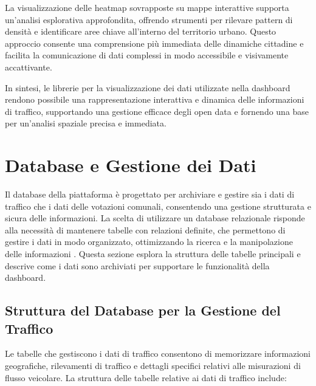 La visualizzazione delle heatmap sovrapposte su mappe interattive supporta un'analisi esplorativa approfondita, offrendo strumenti per rilevare pattern di densità e identificare aree chiave all'interno del territorio urbano. Questo approccio consente una comprensione più immediata delle dinamiche cittadine e facilita la comunicazione di dati complessi in modo accessibile e visivamente accattivante.

In sintesi, le librerie per la visualizzazione dei dati utilizzate nella dashboard rendono possibile una rappresentazione interattiva e dinamica delle informazioni di traffico, supportando una gestione efficace degli open data e fornendo una base per un'analisi spaziale precisa e immediata.

\section{Database e Gestione dei Dati}

Il database della piattaforma è progettato per archiviare e gestire sia i dati di traffico che i dati delle votazioni comunali, consentendo una gestione strutturata e sicura delle informazioni. La scelta di utilizzare un database relazionale risponde alla necessità di mantenere tabelle con relazioni definite, che permettono di gestire i dati in modo organizzato, ottimizzando la ricerca e la manipolazione delle informazioni \cite{connolly2014database}. Questa sezione esplora la struttura delle tabelle principali e descrive come i dati sono archiviati per supportare le funzionalità della dashboard.

\subsection{Struttura del Database per la Gestione del Traffico}
Le tabelle che gestiscono i dati di traffico consentono di memorizzare informazioni geografiche, rilevamenti di traffico e dettagli specifici relativi alle misurazioni di flusso veicolare. La struttura delle tabelle relative ai dati di traffico include:

